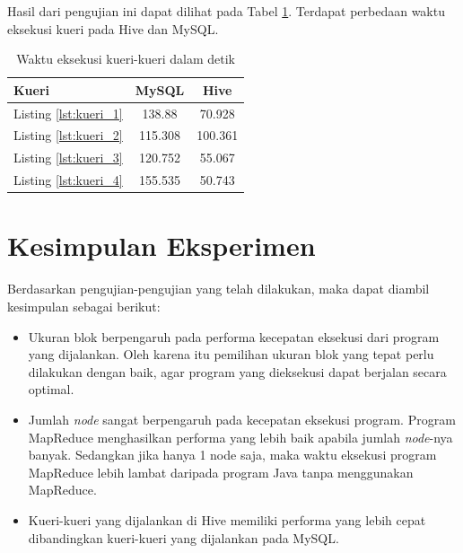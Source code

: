 Hasil dari pengujian ini dapat dilihat pada Tabel \ref{tab:eks_kueri}. Terdapat perbedaan waktu eksekusi kueri pada Hive dan MySQL.

\begin{table}
	\centering
	\begin{tabular}{| l | c | c |}
		\hline
		Kueri	& MySQL & Hive  \\
		\hline
		Listing \ref{lst:kueri_1} & 138.88 & 70.928 \\
		Listing \ref{lst:kueri_2} & 115.308 & 100.361 \\
		Listing \ref{lst:kueri_3} & 120.752 & 55.067 \\
		Listing \ref{lst:kueri_4} & 155.535 & 50.743 \\
		\hline
	\end{tabular}	
	\caption{Waktu eksekusi kueri-kueri dalam detik}\label{tab:eks_kueri}
\end{table}	

\section{Kesimpulan Eksperimen}
Berdasarkan pengujian-pengujian yang telah dilakukan, maka dapat diambil kesimpulan sebagai berikut:

\begin{itemize}
	\item Ukuran blok berpengaruh pada performa kecepatan eksekusi dari program yang dijalankan. Oleh karena itu pemilihan ukuran blok yang tepat perlu dilakukan dengan baik, agar program yang dieksekusi dapat berjalan secara optimal.
	\item Jumlah \textit{node} sangat berpengaruh pada kecepatan eksekusi program. Program MapReduce menghasilkan performa yang lebih baik apabila jumlah \textit{node}-nya banyak. Sedangkan jika hanya 1 node saja, maka waktu eksekusi program MapReduce lebih lambat daripada program Java tanpa menggunakan MapReduce.
	\item Kueri-kueri yang dijalankan di Hive memiliki performa yang lebih cepat dibandingkan kueri-kueri yang dijalankan pada MySQL.
\end{itemize}